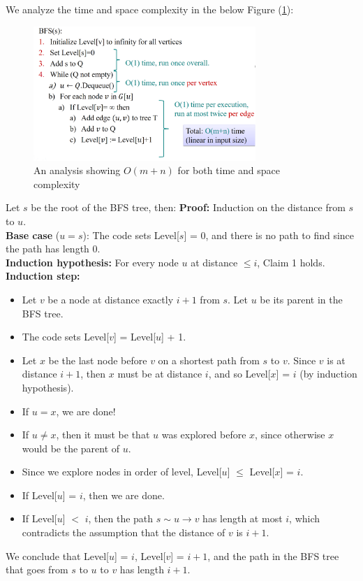 We analyze the time and space complexity in the below Figure (\ref{fig:bfs_q_ana}):

\begin{figure}[h]
    \begin{center}
      \includegraphics[height=2in]{./Sections/graphs/bfs_q_ana.png}
    \end{center}
     \caption{An analysis showing $O(m+n)$ for both time and space complexity}\label{fig:bfs_q_ana}
  \end{figure}
  \begin{Proof}
    Let $s$ be the root of the BFS tree, then:
    \textbf{Proof:} Induction on the distance from $s$ to $u$.\\
    \textbf{Base case} ($u = s$): The code sets Level[$s$] = 0, and there is no path to find since the path has length 0.\\
    \textbf{Induction hypothesis:} For every node $u$ at distance $\leq i$, Claim 1 holds.\\
    \textbf{Induction step:}
    \begin{itemize}
        \item Let $v$ be a node at distance exactly $i + 1$ from $s$. Let $u$ be its parent in the BFS tree.
        \item The code sets Level[$v$] = Level[$u$] + 1.
        \item Let $x$ be the last node before $v$ on a shortest path from $s$ to $v$. Since $v$ is at distance $i + 1$, then $x$ must be at distance $i$, and so Level[$x$] = $i$ (by induction hypothesis).
        \item If $u = x$, we are done!
        \item If $u \neq x$, then it must be that $u$ was explored before $x$, since otherwise $x$ would be the parent of $u$.
        \item Since we explore nodes in order of level, Level[$u$] $\leq$ Level[$x$] = $i$.
        \item If Level[$u$] = $i$, then we are done.
        \item If Level[$u$] $<$ $i$, then the path $s \sim u \to v$ has length at most $i$, which contradicts the assumption that the distance of $v$ is $i + 1$.
    \end{itemize}
    
    \noindent
    We conclude that Level[$u$] = $i$, Level[$v$] = $i + 1$, and the path in the BFS tree that goes from $s$ to $u$ to $v$ has length $i + 1$.
    \end{Proof}
    

